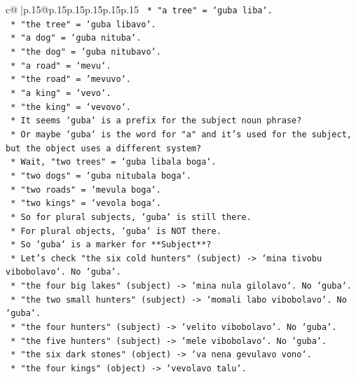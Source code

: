 \documentclass{article}
\begin{document}
{\begin{supertabular}{c@{$\;$}|p{.15\linewidth}@{}p{.15\linewidth}p{.15\linewidth}p{.15\linewidth}p{.15\linewidth}p{.15\linewidth}}
{{{\texttt{        *   "a tree" = `guba liba`.} \\
\texttt{        *   "the tree" = `guba libavo`.} \\
\texttt{        *   "a dog" = `guba nituba`.} \\
\texttt{        *   "the dog" = `guba nitubavo`.} \\
\texttt{        *   "a road" = `mevu`.} \\
\texttt{        *   "the road" = `mevuvo`.} \\
\texttt{        *   "a king" = `vevo`.} \\
\texttt{        *   "the king" = `vevovo`.} \\
\texttt{        *   It seems `guba` is a prefix for the subject noun phrase?} \\
\texttt{        *   Or maybe `guba` is the word for "a" and it's used for the subject, but the object uses a different system?} \\
\texttt{        *   Wait, "two trees" = `guba libala boga`.} \\
\texttt{        *   "two dogs" = `guba nitubala boga`.} \\
\texttt{        *   "two roads" = `mevula boga`.} \\
\texttt{        *   "two kings" = `vevola boga`.} \\
\texttt{        *   So for plural subjects, `guba` is still there.} \\
\texttt{        *   For plural objects, `guba` is NOT there.} \\
\texttt{        *   So `guba` is a marker for **Subject**?} \\
\texttt{        *   Let's check "the six cold hunters" (subject) {-}> `mina tivobu vibobolavo`. No `guba`.} \\
\texttt{        *   "the four big lakes" (subject) {-}> `mina nula gilolavo`. No `guba`.} \\
\texttt{        *   "the two small hunters" (subject) {-}> `momali labo vibobolavo`. No `guba`.} \\
\texttt{        *   "the four hunters" (subject) {-}> `velito vibobolavo`. No `guba`.} \\
\texttt{        *   "the five hunters" (subject) {-}> `mele vibobolavo`. No `guba`.} \\
\texttt{        *   "the six dark stones" (object) {-}> `va nena gevulavo vono`.} \\
\texttt{        *   "the four kings" (object) {-}> `vevolavo talu`.} \\
}}}
\end{supertabular}}
\end{document}
